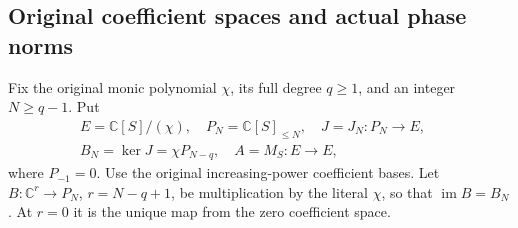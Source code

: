 \documentclass[11pt,a4paper]{article}
\theoremstyle{definition}
\providecommand{\im}{\operatorname{im}}
\providecommand{\C}{\mathbb C}
\begin{document}
\subsection{Original coefficient spaces and actual phase norms}

Fix the original monic polynomial $\chi$, its full degree $q\ge1$,
and an integer $N\ge q-1$. Put
\[
 \begin{gathered}
 E=\C[S]/(\chi),\quad P_N=\C[S]_{\le N},\quad
 J=J_N:P_N\longrightarrow E,\quad\\
 B_N=\ker J=\chi P_{N-q},\quad A=M_S:E\longrightarrow E,
 \end{gathered}
 \tag{HCD1}
\]
where $P_{-1}=0$. Use the original increasing-power coefficient
bases. Let $B:\C^r\to P_N$, $r=N-q+1$, be multiplication by
the literal $\chi$, so that $\im B=B_N$. At $r=0$ it is the
unique map from the zero coefficient space.
\end{document}
